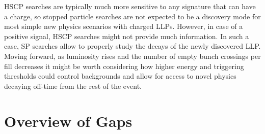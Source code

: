 HSCP searches are typically much more sensitive to any signature that can have a charge, so stopped particle searches are not expected to be a discovery mode for most simple new physics scenarios with charged LLPs. However, in case of a positive signal, HSCP searches might not provide much information. In such a case, SP searches allow to properly study the decays of the newly discovered LLP. 
Moving forward, as luminosity rises and the number of empty bunch crossings per fill decreases it might be worth considering how higher energy and triggering thresholds could control backgrounds and allow for access to novel physics decaying off-time from the rest of the event. 

\section{Overview of Gaps}
\label{sec:covgaps}

